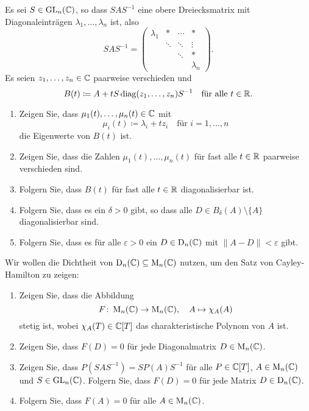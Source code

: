 \documentclass[a4paper,10pt]{scrartcl}
\begin{document}
\begin{question}
  Es sei $S \in \operatorname{GL}_n(\mathbb{C})$, so dass $S A S^{-1}$ eine obere Dreiecksmatrix mit Diagonaleinträgen $\lambda_1, \dotsc, \lambda_n$ ist, also
  \[
    S A S^{-1}
    =
    \begin{pmatrix}
      \lambda_1 & *       & \cdots  & *         \\
                & \ddots  & \ddots  & \vdots    \\
                &         & \ddots  & *         \\
                &         &         & \lambda_n
    \end{pmatrix}.
  \]
  Es seien $z_1, \dotsc, z_n \in \mathbb{C}$ paarweise verschieden und
  \[
    B(t)
    \coloneqq
    A + t S \operatorname{\operatorname{diag}}(z_1, \dotsc, z_n) S^{-1}
    \quad
    \text{für alle $t \in \mathbb{R}$}.
  \]
  \begin{enumerate}
    \item
      Zeigen Sie, dass $\mu_1(t), \dotsc, \mu_n(t) \in \mathbb{C}$ mit
      \[
        \mu_i(t) \coloneqq \lambda_i + t z_i
        \quad
        \text{für $i = 1, \dotsc, n$}
      \]
      die Eigenwerte von $B(t)$ ist.
    \item
      Zeigen Sie, dass die Zahlen $\mu_1(t), \dotsc, \mu_n(t)$ für fast alle $t \in \mathbb{R}$ paarweise verschieden sind.
    \item
      Folgern Sie, dass $B(t)$ für fast alle $t \in \mathbb{R}$ diagonalisierbar ist.
    \item
      Folgern Sie, dass es ein $\delta > 0$ gibt, so dass alle $D \in B_\delta(A) \setminus \{A\}$ diagonalisierbar sind.
    \item
      Folgern Sie, dass es für alle $\varepsilon > 0$ ein $D \in \operatorname{D}_n(\mathbb{C})$ mit $\|A-D\| < \varepsilon$ gibt.
  \end{enumerate}
  Wir wollen die Dichtheit von $\operatorname{D}_n(\mathbb{C}) \subseteq \operatorname{M}_n(\mathbb{C})$ nutzen, um den Satz von Cayley-Hamilton zu zeigen:
  \begin{enumerate}[resume]
    \item
      Zeigen Sie, dass die Abbildung
      \[
        F \colon \operatorname{M}_n(\mathbb{C}) \to \operatorname{M}_n(\mathbb{C}),
        \quad
        A \mapsto \chi_A(A)
      \]
      stetig ist, wobei $\chi_A(T) \in \mathbb{C}[T]$ das charakteristische Polynom von $A$ ist.
    \item
      Zeigen Sie, dass $F(D) = 0$ für jede Diagonalmatrix $D \in \operatorname{M}_n(\mathbb{C})$.
    \item
      Zeigen Sie, dass $P(SAS^{-1}) = S P(A) S^{-1}$ für alle $P \in \mathbb{C}[T]$, $A \in \operatorname{M}_n(\mathbb{C})$ und $S \in \operatorname{GL}_n(\mathbb{C})$.
      Folgern Sie, dass $F(D) = 0$ für jede Matrix $D \in \operatorname{D}_n(\mathbb{C})$.
    \item
      Folgern Sie, dass $F(A) = 0$ für alle $A \in \operatorname{M}_n(\mathbb{C})$.
  \end{enumerate}
\end{question}
\end{document}
